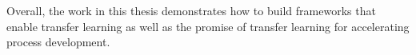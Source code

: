 Overall, the work in this thesis demonstrates how to build frameworks that enable transfer learning as well as the promise of transfer learning for accelerating process development.





